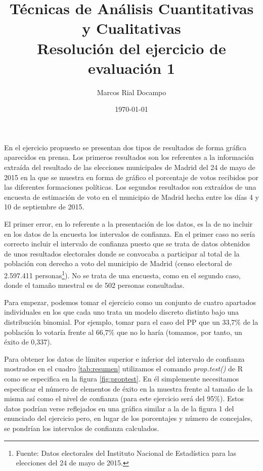 \documentclass[11pt,a4paper]{article}
\author{Marcos Rial Docampo}
\title{Técnicas de Análisis Cuantitativas y Cualitativas\\Resolución del ejercicio de evaluación 1}
\date{\small{\today}}
\begin{document}
\maketitle

En el ejercicio propuesto se presentan dos tipos de resultados de forma gráfica aparecidos en prensa. Los primeros resultados son los referentes a la información extraída del resultado de las elecciones municipales de Madrid del 24 de mayo de 2015 en la que se muestra en forma de gráfico el porcentaje de votos recibidos por las diferentes formaciones políticas. Los segundos resultados son extraídos de una encuesta de estimación de voto en el municipio de Madrid hecha entre los días 4 y 10 de septiembre de 2015.

El primer error, en lo referente a la presentación de los datos, es la de no incluir en los datos de la encuesta los intervalos de confianza. En el primer caso no sería correcto incluir el intervalo de confianza puesto que se trata de datos obtenidos de unos resultados electorales donde se convocaba a participar al total de la población con derecho a voto del municipio de Madrid (censo electoral de 2.597.411 personas\footnote{Fuente: Datos electorales del Instituto Nacional de Estadística para las elecciones del 24 de mayo de 2015.}). No se trata de una encuesta, como en el segundo caso, donde el tamaño muestral es de 502 personas consultadas.

Para empezar, podemos tomar el ejercicio como un conjunto de cuatro apartados individuales en los que cada uno trata un modelo discreto distinto bajo una distribución binomial. Por ejemplo, tomar para el caso del PP que un 33,7\% de la población lo votaría frente al 66,7\% que no lo haría (tomamos, por tanto, un éxito de 0,337).

Para obtener los datos de límites superior e inferior del intervalo de confianza mostrados en el cuadro \ref{tab:resumen} utilizamos el comando \textit{prop.test()} de R como se especifica en la figura \ref{fig:proptest}. En él simplemente necesitamos especificar el número de elementos de éxito en la muestra frente al tamaño de la misma así como el nivel de confianza (para este ejercicio será del 95\%). Estos datos podrían verse reflejados en una gráfica similar a la de la figura 1 del enunciado del ejercicio pero, en lugar de los porcentajes y número de concejales, se pondrían los intervalos de confianza calculados.
\end{document}
